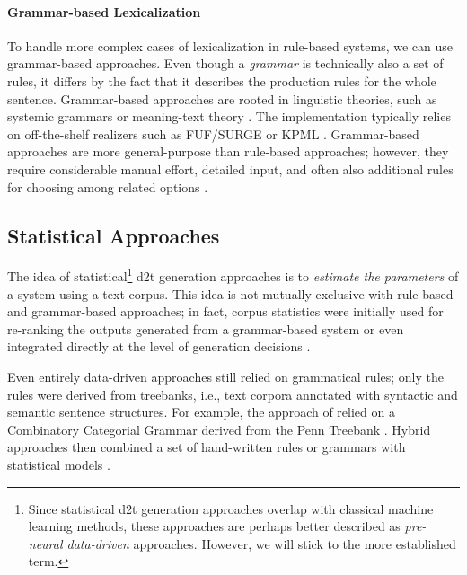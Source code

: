 {\paragraph{Grammar-based Lexicalization}
To handle more complex cases of lexicalization in rule-based systems, we can use grammar-based approaches. Even though a \emph{grammar} is technically also a set of rules, it differs by the fact that it describes the production rules for the whole sentence.
Grammar-based approaches are rooted in linguistic theories, such as systemic grammars \cite{halliday1985systemic,matthiessen1991lexico} or meaning-text theory \cite{mel1988dependency,goldberg1994using}. The implementation typically relies on off-the-shelf realizers such as FUF/SURGE \cite{elhadad1997surge} or KPML \cite{bateman1997enabling}. Grammar-based approaches are more general-purpose than rule-based approaches; however, they require considerable manual effort, detailed input, and often also additional rules for choosing among related options \cite{gattSurveyStateArt2018}.


\subsection{Statistical Approaches}
\label{sec:stat-d2t}
The idea of statistical\footnote{Since statistical \ac{d2t} generation approaches overlap with classical machine learning methods, these approaches are perhaps better described as \emph{pre-neural data-driven} approaches. However, we will stick to the more established term.} \ac{d2t} generation approaches is to \emph{estimate the parameters} of a system using a text corpus. This idea is not mutually exclusive with rule-based and grammar-based approaches; in fact, corpus statistics were initially used for re-ranking the outputs generated from a grammar-based system \cite{bangalore2000corpus,langkilde2000forest,ratnaparkhi2000trainable} or even integrated directly at the level of generation decisions \cite{belz2008automatic}.

Even entirely data-driven approaches still relied on grammatical rules; only the rules were derived from treebanks, i.e., text corpora annotated with syntactic and semantic sentence structures. For example, the approach of \citet{white2007towards} relied on a Combinatory Categorial Grammar \cite{steedman2001syntactic} derived from the Penn Treebank \cite{hockenmaier2007ccgbank}. Hybrid approaches then combined a set of hand-written rules or grammars with statistical models \cite{konstas2012concept,gardent2017statistical}.

}
